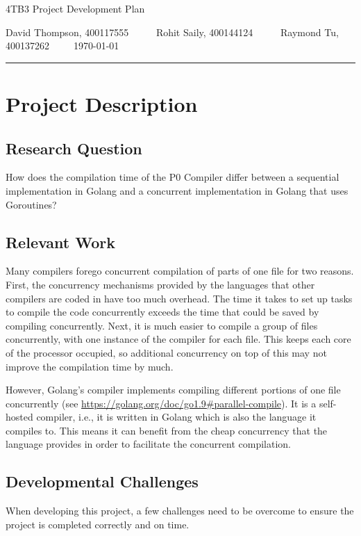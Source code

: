 \documentclass{article}
\author{Rohit Saily, David Thompson, Raymond Tu}
\date{\today}
\title{\mytitle}
\newcommand{\mytitle}{4TB3 Project Development Plan}
\begin{document}
{\sffamily
{\huge \mytitle}

\medskip

David Thompson, 400117555~~~~~
Rohit Saily, 400144124~~~~~
Raymond Tu, 400137262~~~~~\today
}

\par\noindent\rule{\textwidth}{0.4pt}
\bigskip

\section{Project Description}

\subsection{Research Question}

How does the compilation time of the P0 Compiler differ between a sequential implementation in Golang and a concurrent implementation in Golang that uses Goroutines?  

\subsection{Relevant Work}

Many compilers forego concurrent compilation of parts of one file for two
reasons.
First, the concurrency mechanisms provided by the languages that other compilers
are coded in have too much overhead.
The time it takes to set up tasks to compile the code concurrently exceeds the
time that could be saved by compiling concurrently.
Next, it is much easier to compile a group of files concurrently, with one
instance of the compiler for each file.
This keeps each core of the processor occupied, so additional concurrency on top
of this may not improve the compilation time by much.

However, Golang's compiler implements compiling different portions of one file
concurrently (see \url{https://golang.org/doc/go1.9#parallel-compile}).
It is a self-hosted compiler, i.e., it is written in Golang which is also the language it compiles to.
This means it can benefit from the cheap concurrency that the language provides
in order to facilitate the concurrent compilation.

\subsection{Developmental Challenges}
When developing this project, a few challenges need to be overcome to ensure the 
project is completed correctly and on time.
\end{document}

